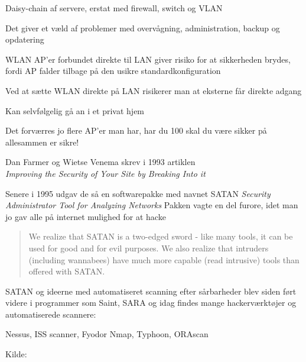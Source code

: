 

\begin{list1}
\item Daisy-chain af servere, erstat med firewall, switch og VLAN
\vskip 1cm
\item Det giver et væld af problemer med overvågning, administration, backup og opdatering
\end{list1}



\begin{list1}
\item WLAN AP'er forbundet direkte til LAN giver risiko for at sikkerheden brydes, fordi AP falder tilbage på den usikre standardkonfiguration
\vskip 1cm
\item Ved at sætte WLAN direkte på LAN risikerer man at eksterne får direkte adgang
\item Kan selvfølgelig gå an i et privat hjem
\item Det forværres jo flere AP'er man har, har du 100 skal du være sikker på allesammen er sikre!
\end{list1}





\begin{list1}
\item Dan Farmer og Wietse Venema skrev i 1993 artiklen\\
\emph{Improving the Security of Your Site by Breaking Into it}
\item Senere i 1995 udgav de så en softwarepakke med navnet SATAN
\emph{Security Administrator Tool for Analyzing Networks}
 Pakken vagte
 en del furore, idet man jo gav alle på internet mulighed for at hacke
\begin{quote}
We realize that SATAN is a two-edged sword - like
many tools, it can be used for good and for evil
purposes. We also realize that intruders (including
wannabees) have much more capable (read intrusive)
tools than offered with SATAN. 
\end{quote}
\item SATAN og ideerne med automatiseret scanning efter sårbarheder
  blev siden ført videre i programmer som Saint, SARA og idag findes
  mange hackerværktøjer og automatiserede scannere: 
\begin{list2}
\item Nessus, ISS scanner, Fyodor Nmap, Typhoon, ORAscan
\end{list2}
\end{list1}
Kilde:



